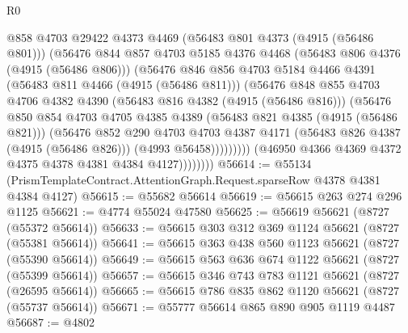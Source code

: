 \begin{lexlean}{R0}
\begin{coremodule}
                        @858
                        @4703
                        @29422
                        @4373
                        @4469
                        (@56483 @801 @4373 (@4915 (@56486 @801)))
                        (@56476
                          @844
                          @857
                          @4703
                          @5185
                          @4376
                          @4468
                          (@56483 @806 @4376 (@4915 (@56486 @806)))
                          (@56476
                            @846
                            @856
                            @4703
                            @5184
                            @4466
                            @4391
                            (@56483 @811 @4466 (@4915 (@56486 @811)))
                            (@56476
                              @848
                              @855
                              @4703
                              @4706
                              @4382
                              @4390
                              (@56483 @816 @4382 (@4915 (@56486 @816)))
                              (@56476
                                @850
                                @854
                                @4703
                                @4705
                                @4385
                                @4389
                                (@56483 @821 @4385 (@4915 (@56486 @821)))
                                (@56476
                                  @852
                                  @290
                                  @4703
                                  @4703
                                  @4387
                                  @4171
                                  (@56483 @826 @4387 (@4915 (@56486 @826)))
                                  (@4993 @56458)))))))))
                  (@46950 @4366 @4369 @4372 @4375 @4378 @4381 @4384 @4127))))))))
@56614 := @55134 (PrismTemplateContract.AttentionGraph.Request.sparseRow @4378 @4381 @4384 @4127)
@56615 := @55682 @56614
@56619 := @56615 @263 @274 @296 @1125
@56621 := @4774 @55024 @47580
@56625 := @56619 @56621 (@8727 (@55372 @56614))
@56633 := @56615 @303 @312 @369 @1124 @56621 (@8727 (@55381 @56614))
@56641 := @56615 @363 @438 @560 @1123 @56621 (@8727 (@55390 @56614))
@56649 := @56615 @563 @636 @674 @1122 @56621 (@8727 (@55399 @56614))
@56657 := @56615 @346 @743 @783 @1121 @56621 (@8727 (@26595 @56614))
@56665 := @56615 @786 @835 @862 @1120 @56621 (@8727 (@55737 @56614))
@56671 := @55777 @56614 @865 @890 @905 @1119 @4487
@56687 := @4802

\end{coremodule}
\end{lexlean}
